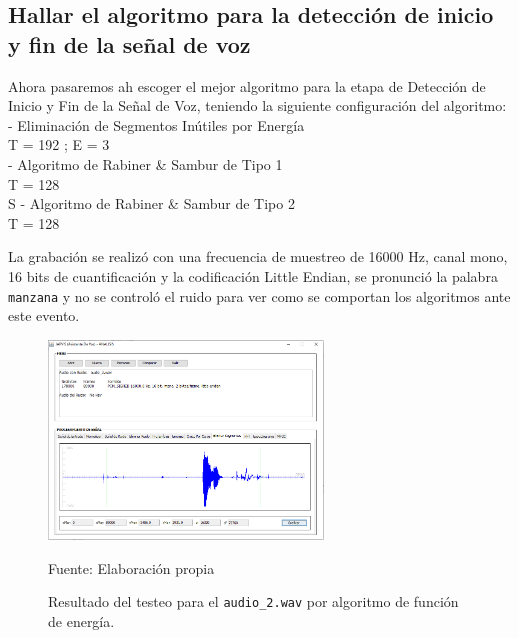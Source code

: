 

\subsection{Hallar el algoritmo para la detección de inicio y fin de la señal de voz}
Ahora pasaremos ah escoger el mejor algoritmo para la etapa de Detección de Inicio y Fin de la Señal de Voz, teniendo la siguiente configuración del algoritmo: \\
- Eliminación de Segmentos Inútiles por Energía \\
\hspace*{1cm} T = 192 ; \qquad E = 3 \\
- Algoritmo de Rabiner \& Sambur de Tipo 1 \\
\hspace*{1cm} T = 128 \\S
- Algoritmo de Rabiner \& Sambur de Tipo 2 \\
\hspace*{1cm} T = 128 

La grabación se realizó con una frecuencia de muestreo de 16000 Hz, canal mono, 16 bits de cuantificación y la codificación Little Endian, se pronunció la palabra \texttt{manzana} y no se controló el ruido para ver como se comportan los algoritmos ante este evento.

\begin{figure}[H]
\begin{center}
\includegraphics[width=0.65\textwidth]{Imagenes/Cap3/image074}
\end{center}
\begin{center}
\vskip -0.5cm
\caption{\small{Resultado del testeo para el \texttt{audio\_2.wav} por algoritmo de función de energía.}}
\label{fig:figura3.74}
{\small{Fuente: Elaboración propia}}
\end{center}
\end{figure}

